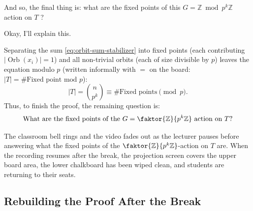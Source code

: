\begin{proofWrapper}
\begin{speech}[00:43:03 - 00:45:00]
And so, the final thing is: what are the fixed points of this $G = \mathbb{Z} \bmod p^k \mathbb{Z}$ action on $T$ ?

Okay, I'll explain this. 
\end{speech}

\begin{content}

Separating the sum \eqref{eq:orbit-sum-stabilizer} into fixed points (each contributing $|\operatorname{Orb}(x_i)| = 1$) and all non-trivial orbits (each of size divisible by $p$) leaves the equation modulo $p$ (written informally with $=$ on the board: $|T| = \text{\# Fixed point mod } p$):
\begin{equation}\label{eq:fixed-pt-congruence}
|T| = \binom{n}{p^k} \equiv \#\text{Fixed points} \pmod{p}.
\end{equation}
Thus, to finish the proof, the remaining question is:
\[
\text{What are the fixed points of the } G = \faktor{\mathbb{Z}}{p^k\mathbb{Z}} \text{ action on } T\text{?}
\]
\end{content}

\begin{pause}
The classroom bell rings and the video fades out as the lecturer pauses before answering what the fixed points of the $\faktor{\mathbb{Z}}{p^k\mathbb{Z}}$-action on $T$ are. When the recording resumes after the break, the projection screen covers the upper board area, the lower chalkboard has been wiped clean, and students are returning to their seats.
\end{pause}

\subsection{Rebuilding the Proof After the Break}


\end{proofWrapper}
